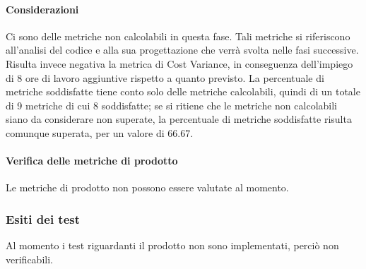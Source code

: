 	\paragraph{Considerazioni}
	Ci sono delle metriche non calcolabili in questa fase. Tali metriche si riferiscono all'analisi del codice e alla sua progettazione che verrà svolta nelle fasi successive.
	Risulta invece negativa la metrica di Cost Variance, in conseguenza dell'impiego di 8 ore di lavoro aggiuntive rispetto a quanto previsto. 
	La percentuale di metriche soddisfatte tiene conto solo delle metriche calcolabili, quindi di un totale di 9 metriche di cui 8 soddisfatte; se si ritiene che le metriche non calcolabili siano da considerare non superate, la percentuale di metriche soddisfatte risulta comunque superata, per un valore di 66.67.
	\paragraph{Verifica delle metriche di prodotto} 

	Le metriche di prodotto non possono essere valutate al momento.


\subsubsection{Esiti dei test}
	Al momento i test riguardanti il prodotto non sono implementati, perciò non verificabili. 
	
